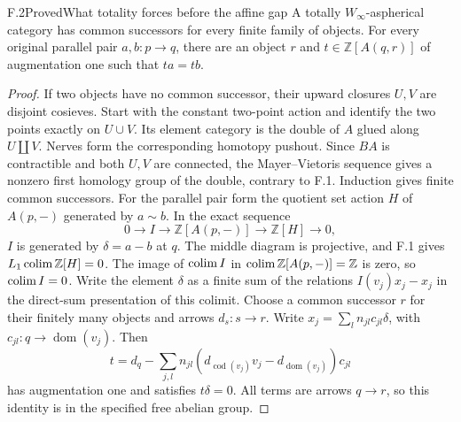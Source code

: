 \begin{claim}{F.2}{Proved}{What totality forces before the affine gap}
A totally $W_\infty$-aspherical category has common successors for every finite family of objects. For every original parallel pair $a,b:p\to q$, there are an object $r$ and $t\in\mathbb Z[A(q,r)]$ of augmentation one such that $ta=tb$.
\end{claim}
\begin{proof}
If two objects have no common successor, their upward closures $U,V$ are disjoint cosieves. Start with the constant two-point action and identify the two points exactly on $U\cup V$. Its element category is the double of $A$ glued along $U\amalg V$. Nerves form the corresponding homotopy pushout. Since $BA$ is contractible and both $U,V$ are connected, the Mayer--Vietoris sequence gives a nonzero first homology group of the double, contrary to F.1. Induction gives finite common successors.
For the parallel pair form the quotient set action $H$ of $A(p,-)$ generated by $a\sim b$. In the exact sequence
\[
0\longrightarrow I\longrightarrow\mathbb Z[A(p,-)]\longrightarrow\mathbb Z[H]\longrightarrow0,
\]
$I$ is generated by $\delta=a-b$ at $q$. The middle diagram is projective, and F.1 gives $L_1\operatorname{colim}\mathbb Z[H]=0$. The image of $\operatorname{colim} I$ in $\operatorname{colim}\mathbb Z[A(p,-)]=\mathbb Z$ is zero, so $\operatorname{colim} I=0$. Write the element $\delta$ as a finite sum of the relations $I(v_j)x_j-x_j$ in the direct-sum presentation of this colimit. Choose a common successor $r$ for their finitely many objects and arrows $d_s:s\to r$. Write $x_j=\sum_l n_{jl}c_{jl}\delta$, with $c_{jl}:q\to\operatorname{dom}(v_j)$. Then
\[
t=d_q-\sum_{j,l}n_{jl}(d_{\operatorname{cod}(v_j)}v_j-d_{\operatorname{dom}(v_j)})c_{jl}
\]
has augmentation one and satisfies $t\delta=0$. All terms are arrows $q\to r$, so this identity is in the specified free abelian group.
\end{proof}

